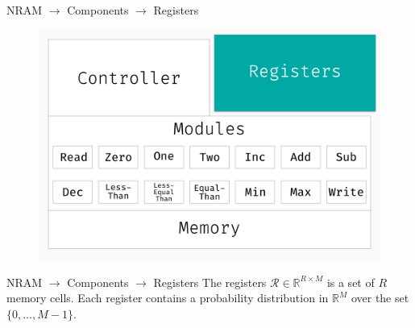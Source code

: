 \documentclass[xcolor={usenames}]{beamer}
\begin{document}
  \begin{frame}{NRAM \(\rightarrow\) Components \(\rightarrow\)  Registers}
  	\begin{figure}
  		\centering
  		\includegraphics[width=\textwidth]{../figures/schema-nram-with-memory-REGISTERS.png}
  	\end{figure}
  \end{frame}
  
  \begin{frame}{NRAM \(\rightarrow\) Components \(\rightarrow\)  Registers}
  	The registers $\mathcal{R} \in \mathbb{R}^{R \times M}$ is a set of $R$ memory cells. Each register contains a probability distribution  in $\mathbb{R}^M$ over the set $\{0, \dots, M-1\}$.
  	
  \end{frame}
  
\end{document}
